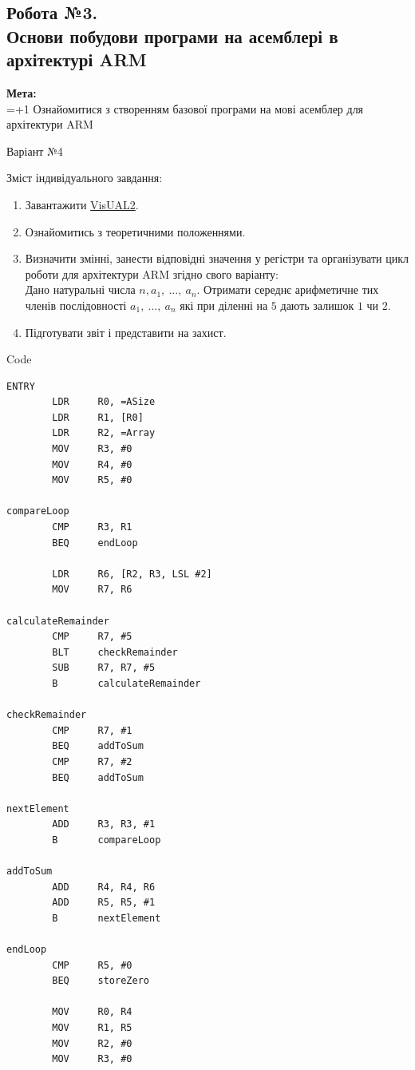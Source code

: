 \documentclass[a4paper,12pt]{article}
\begin{document}
\newpage
    \begin{center}
        \section*{\bfseries{Робота №3.\\
        Основи побудови програми на асемблері в архітектурі ARM
    }}
    \end{center}
    \textbf{Мета:} \\
    \hangindent=1.5cm 
    \hangafter=+1 \noindent
    Ознайомитися з створенням базової програми на мові асемблер для архітектури ARM \\
    \begin{center}
        \Large{Варіант №4}
    \end{center}
    Зміст індивідуального завдання:
    \begin{enumerate}
        \item Завантажити \href{https://github.com/tomcl/V2releases}{VisUAL2}.
        \item Ознайомитись з теоретичними положеннями.
        \item Визначити змінні, занести відповідні значення у регістри та організувати цикл
        роботи для архітектури ARM згідно свого варіанту: \\
        Дано натуральні числа $n, a_1,\:...,\:a_n$. Отримати середнє арифметичне тих
        членів послідовності $a_1,\:...,\:a_n$ які при діленні на $5$ дають залишок $1$ чи $2$.
        \item Підготувати звіт і представити на захист.
    \end{enumerate}

\newpage
    \begin{center}
        \Large{Code}
    \end{center}
    \begin{lstlisting}[language=assembler]
ENTRY              
        LDR     R0, =ASize
        LDR     R1, [R0]
        LDR     R2, =Array
        MOV     R3, #0
        MOV     R4, #0
        MOV     R5, #0

compareLoop        
        CMP     R3, R1
        BEQ     endLoop

        LDR     R6, [R2, R3, LSL #2]
        MOV     R7, R6

calculateRemainder 
        CMP     R7, #5
        BLT     checkRemainder
        SUB     R7, R7, #5
        B       calculateRemainder

checkRemainder     
        CMP     R7, #1
        BEQ     addToSum
        CMP     R7, #2
        BEQ     addToSum

nextElement        
        ADD     R3, R3, #1
        B       compareLoop

addToSum           
        ADD     R4, R4, R6
        ADD     R5, R5, #1
        B       nextElement

endLoop            
        CMP     R5, #0
        BEQ     storeZero

        MOV     R0, R4
        MOV     R1, R5
        MOV     R2, #0
        MOV     R3, #0
    \end{lstlisting}
\end{document}
